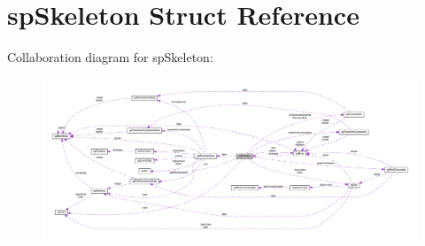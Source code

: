 \hypertarget{structspSkeleton}{}\section{sp\+Skeleton Struct Reference}
\label{structspSkeleton}


Collaboration diagram for sp\+Skeleton\+:
\nopagebreak
\begin{figure}[H]
\begin{center}
\leavevmode
\includegraphics[width=350pt]{structspSkeleton__coll__graph}
\end{center}
\end{figure}
